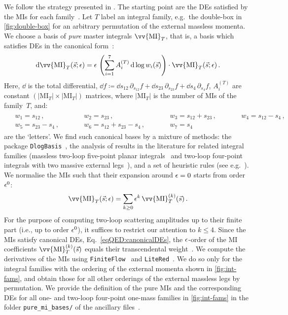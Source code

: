 \documentclass[main.tex]{subfiles}
\begin{document}
We follow the strategy presented in . The starting point are the DEs satisfied by the MIs for each family~\cite{Barucchi:1973zm, KOTIKOV1991158, KOTIKOV1991123, Gehrmann:1999as, Bern:1993kr}. Let $T$ label an integral family, e.g.\ the double-box in \cref{fig:double-box} for an arbitrary permutation of the external massless momenta. We choose a basis of \emph{pure} master integrals $\vv{\text{MI}}_T$, that is, a basis which satisfies DEs in the canonical form~\cite{Henn:2013pwa}:
\begin{align}
\label{eqQED:canonicalDEs}
\dd \vv{\text{MI}}_T(\vec{s}; \eps) = \eps \, \left( \sum_{i=1}^{7} A^{(T)}_i \, \dd \log w_i(\vec{s}) \right) \cdot \vv{\text{MI}}_T(\vec{s}; \eps) \,.
\end{align}
Here, $\dd$ is the total differential, $\dd f \coloneqq \dd s_{12} \, \partial_{s_{12}} f + \dd s_{23} \, \partial_{s_{23}} f +  \dd s_{4} \, \partial_{s_{4}} f $, $A^{(T)}_i$ are constant $\left(|\text{MI}_T| \times |\text{MI}_T|\right)$ matrices, where $|\text{MI}_T|$ is the number of MIs of the family~$T$, and: 
\begin{align}
\label{eqQED:alphabet}
\begin{alignedat}{4}
& w_1 = s_{12} \,, 
&& w_2 = s_{23} \,, 
&& w_3 = s_{12} + s_{23} \,, \qquad
&& w_4 = s_{12} - s_4 \,,  \\
& w_5 = s_{23} - s_4 \,, \qquad
&& w_6 = s_{12} + s_{23} - s_4 \,, \qquad
&& w_7 = s_4 \, &&
\end{alignedat}
\end{align}
are the `letters'. We find such canonical bases by a mixture of methods: the package \texttt{DlogBasis}~\cite{Henn:2020lye}, the analysis of results in the literature for related integral families (massless two-loop five-point planar integrals~\cite{Gehrmann:2015bfy} and two-loop four-point integrals with two massive external legs~\cite{Henn:2014lfa,Caola:2014lpa}), and a set of heuristic rules (see e.g.\ ).
We normalise the MIs such that their expansion around $\epsilon=0$ starts from order $\epsilon^0$:
\begin{align}
\vv{\text{MI}}_T(\vec{s} ; \eps) = \sum_{k \ge 0} \eps^k \, \vv{\text{MI}}_T^{(k)}(\vec{s}) \,.
\end{align}
For the purpose of computing two-loop scattering amplitudes up to their finite part (i.e., up to order $\epsilon^0$), it suffices to restrict our attention to $k \le 4$.
Since the MIs satisfy canonical DEs, Eq.~\ref{eqQED:canonicalDEs}, the $\epsilon$-order of the MI coefficients $\vv{\text{MI}}_T^{(k)}(\vec{s})$ equals their transcendental weight~\cite{Henn:2013pwa}.
We compute the derivatives of the MIs using \texttt{FiniteFlow}~\cite{Peraro:2019svx} and \texttt{LiteRed}~\cite{Lee:2012cn}.
We do so only for the integral families with the ordering of the external momenta shown in \cref{fig:int-fams}, and obtain those for all other orderings of the external massless legs by permutation. 
We provide the definition of the pure MIs and the corresponding DEs for all one- and two-loop four-point one-mass families in \cref{fig:int-fams} in the folder \texttt{pure\_mi\_bases/} of the ancillary files~\cite{zenodo}. 
\end{document}

